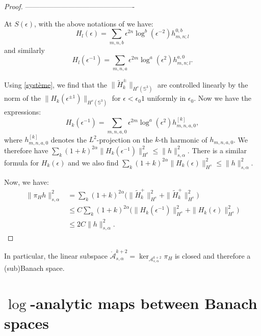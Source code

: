 \documentclass[12pt]{article}
\newcommand{\calA}{{\mathcal A}}
\begin{document}
\begin{proof}
        
----------------------------------------------

      At $S(\epsilon)$, with the above notations of we have: 
        \begin{equation}
            H_l(\epsilon) = \sum_{m,n,b}\epsilon ^{2n}\log^b(\epsilon^{-2}) h_{m,n;l}^{0,b}\label{Hepsilon}
        \end{equation}
        and similarly
        \begin{equation}
            H_l(\epsilon^{-1}) = \sum_{m,n,a}\epsilon^{2m}\log^a(\epsilon^{2}) h_{m,n;l}^{a,0}.\label{Hepsilon-}
        \end{equation}
        
        Using  \eqref{système}, we find that the $\|\tilde{H}_{k}^\pm\|_{H^s(\mathbb{S}^3)}$ are controlled linearly by the norm of the $\|H_k(\epsilon^{\pm 1})\|_{H^s(\mathbb{S}^3)}$ for $\epsilon < \epsilon_0 1$ uniformly in $\epsilon_0$. Now we have the expressions:
        $$ H_k(\epsilon^{-1}) = \sum_{m,n,a,0}\epsilon^{2m}\log^a(\epsilon^{2})h_{m,n,a,0}^{[k]},$$
        where $h_{m,n,a,0}^{[k]}$ denotes the $L^2$-projection on the $k$-th harmonic of $h_{m,n,a,0}$. We therefore have $\sum_k(1+k)^{2\alpha}\|H_k(\epsilon^{-1})\|^2_{H^s}\leqslant \|h\|_{s,\alpha}^2$. There is a similar formula for $H_k(\epsilon)$ and we also find $\sum_k(1+k)^{2\alpha}\|H_k(\epsilon)\|^2_{H^s}\leqslant \|h\|_{s,\alpha}^2$.
         
        Now, we have:
        \begin{align*}
            \|\pi_{H}h\|^2_{s,\alpha} &= \sum_{k}(1+k)^{2\alpha}\Big(\|\tilde{H}_{k}^+\|^2_{H^s}+\|\tilde{H}_{k}^+\|^2_{H^s}\Big)\\
            &\leqslant C \sum_{k}(1+k)^{2\alpha}\Big(\|H_k(\epsilon^{-1})\|^2_{H^s}+\|H_k(\epsilon)\|^2_{H^s}\Big)\\
            &\leqslant 2C\|h\|_{s,\alpha}^2.
        \end{align*}
\end{proof}
    
        In particular, the linear subspace $\mathring{\calA}_{s,\alpha}^{k+2} = \ker_{\calA_{s,\alpha}^{k+2}} \pi_H$ is closed and therefore a (sub)Banach space.


\section{$\log$-analytic maps between Banach spaces}
  
\end{document}
